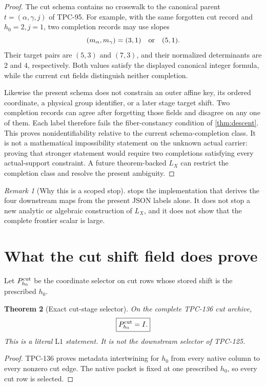 \documentclass[11pt]{article}
\newtheorem{theorem}{Theorem}[section]
\theoremstyle{definition}
\theoremstyle{remark}
\newtheorem{remark}[theorem]{Remark}
\newcommand{\Lone}{\mathrm{L1}}
\begin{document}
\begin{proof}
The cut schema contains no crosswalk to the canonical parent
\(t=(\alpha,\gamma,j)\) of TPC-95.  For example, with the same
forgotten cut record and \(h_0=2,j=1\), two completion records may
use slopes
\[
 (m_\alpha,m_\gamma)=(3,1)
 \quad\hbox{or}\quad(5,1).
\]
Their target pairs are \((5,3)\) and \((7,3)\), and their normalized
determinants are \(2\) and \(4\), respectively.  Both values satisfy
the displayed canonical integer formula, while the current cut
fields distinguish neither completion.

Likewise the present schema does not constrain an outer affine key,
its ordered coordinate, a physical group identifier, or a later
stage target shift.  Two completion records can agree after
forgetting those fields and disagree on any one of them.  Each label
therefore fails the fiber-constancy condition of
\cref{thm:descent}.  This proves nonidentifiability relative to the
current schema-completion class.  It is not a mathematical
impossibility statement on the unknown actual carrier: proving that
stronger statement would require two completions satisfying every
actual-support constraint.  A future theorem-backed \(L_X\) can
restrict the completion class and resolve the present ambiguity.
\end{proof}

\begin{remark}[Why this is a scoped stop]
 stops the implementation that derives the four
downstream maps from the present JSON labels alone.  It does not stop
a new analytic or algebraic construction of \(L_X\), and it does not
show that the complete frontier scalar is large.
\end{remark}

\section{What the cut shift field does prove}

Let \(P_{h_0}^{\rm cut}\) be the coordinate selector on cut rows whose
stored shift is the prescribed \(h_0\).

\begin{theorem}[Exact cut-stage selector]
\label{thm:cutselector}
On the complete TPC-136 cut archive,
\[
 \boxed{P_{h_0}^{\rm cut}=I.}
\]
This is a literal \(\Lone\) statement.  It is not the downstream
selector of TPC-125.
\end{theorem}

\begin{proof}
TPC-136 proves metadata intertwining for \(h_0\) from every native
column to every nonzero cut edge.  The native packet is fixed at one
prescribed \(h_0\), so every cut row is selected.
\end{proof}
\end{document}
